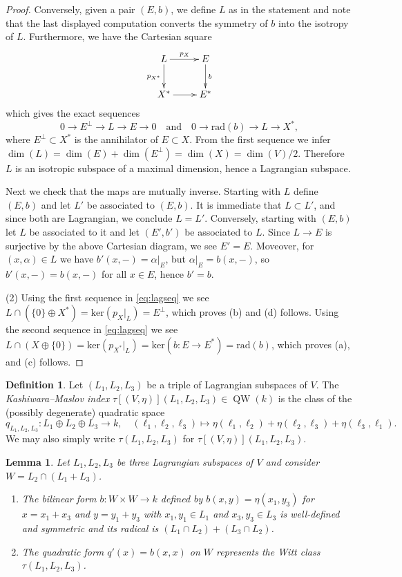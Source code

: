 \documentclass{article}
\def\tx#1{\textrm{#1}}
\newtheorem{lem}[thm]{Lemma}
\theoremstyle{definition}
\newtheorem{dfn}[thm]{Definition}
\numberwithin{equation}{subsection}
\renewcommand{\-}{\hyp{}}
\DeclareMathOperator{\QW}{QW}
\begin{document}
\begin{appendices}
\begin{proof}
	Conversely, given a pair $(E,b)$, we define $L$ as in the statement and note that the last displayed computation converts the symmetry of $b$ into the isotropy of $L$. Furthermore, we have the Cartesian square
	\[ \xymatrix 	{
		L \ar[r]^{p_X}\ar[d]_{p_{X^*}}&E\ar[d]^-b\\
		X^*\ar[r]&E^* }
	\] 
	which gives the exact sequences 
	\begin{equation} \label{eq:lagseq}
		0 \to E^\perp \to L \to E \to 0\quad\text{and}\quad 0 \to \mathrm{rad}(b) \to L \to X^* ,
 	\end{equation}
	where $E^\perp \subset X^*$ is the annihilator of $E \subset X$. From the first sequence we infer $\dim(L)=\dim(E)+\dim(E^\perp)=\dim(X)=\dim(V)/2$. Therefore $L$ is an isotropic subspace of a maximal dimension, hence a Lagrangian subspace.

	Next we check that the maps are mutually inverse. Starting with $L$ define $(E,b)$ and let $L'$ be associated to $(E,b)$. It is immediate that $L \subset L'$, and since both are Lagrangian, we conclude $L=L'$. Conversely, starting with $(E,b)$ let $L$ be associated to it and let $(E',b')$ be associated to $L$. Since $L \to E$ is surjective by the above Cartesian diagram, we see $E'=E$. Moveover, for $(x,\alpha) \in L$ we have $b'(x,-)=\alpha|_E$, but $\alpha|_E=b(x,-)$, so $b'(x,-)=b(x,-)$ for all $x \in E$, hence $b'=b$.

	(2) Using the first sequence in \eqref{eq:lagseq} we see $L \cap (\{0\} \oplus X^*)=\tx{ker}(p_X|_L)=E^\perp$, which proves (b) and (d) follows. Using the second sequence in \eqref{eq:lagseq} we see $L \cap (X \oplus \{0\})=\tx{ker}(p_{X^*}|_L)=\tx{ker}(b : E \to E^*)=\tx{rad}(b)$, which proves (a), and (c) follows.
\end{proof}

\begin{dfn}
	Let $(L_1,L_2,L_3)$ be a triple of Lagrangian subspaces of $V$. The \emph{Kashiwara--Maslov index} $\tau[(V,\eta)](L_1,L_2,L_3) \in \QW(k)$ is the class of the (possibly degenerate) quadratic space
		\[ q_{L_1,L_2,L_3} : L_1 \oplus L_2 \oplus L_3 \to k,\quad (\ell_1,\ell_2,\ell_3) \mapsto \eta(\ell_1,\ell_2)+\eta(\ell_2,\ell_3)+\eta(\ell_3,\ell_1). \]
		We may also simply write $\tau(L_1,L_2,L_3)$ for $\tau[(V,\eta)](L_1,L_2,L_3)$.
\end{dfn}


\begin{lem} \label{lem:maslov_basic1}
	Let $L_1,L_2,L_3$ be three Lagrangian subspaces of $V$ and consider $W=L_2 \cap (L_1+L_3)$.
	\begin{enumerate}
		\item The bilinear form $b : W \times W \to k$ defined by $b(x,y)=\eta(x_1,y_3)$ for $x=x_1+x_3$ and $y=y_1+y_3$ with $x_1, y_1 \in L_1$ and $x_3, y_3 \in L_3$ is well-defined and symmetric and its radical is $(L_1 \cap L_2) + (L_3 \cap L_2)$.
		\item The quadratic form $q'(x)=b(x,x)$ on $W$ represents the Witt class $\tau(L_1,L_2,L_3)$.
	\end{enumerate}
	

\end{lem}
\end{appendices}
\end{document}
